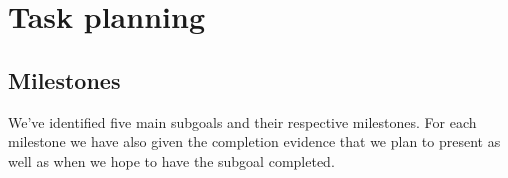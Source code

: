 \documentclass{article}
\begin{document}
\section{Task planning}

\subsection{Milestones} 

We’ve identified five main subgoals and their respective milestones. For each milestone we have also given the completion evidence that we plan to present as well as when we hope to have the subgoal completed.
\end{document}
